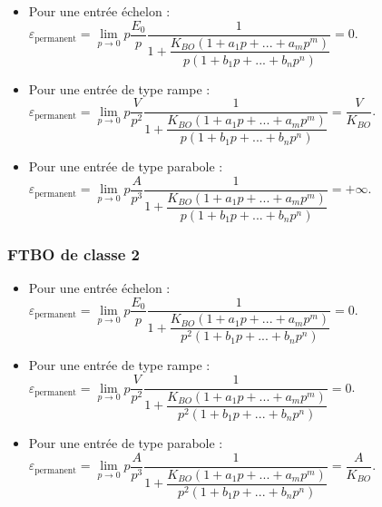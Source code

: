 \documentclass[10pt,fleqn]{article} %
\begin{document}
\begin{itemize}
\item Pour une entrée échelon : 
$\varepsilon_{\text{permanent}}=\lim\limits_{p\to 0} p\dfrac{E_0}{p}\dfrac{1}{1+\dfrac{K_{BO}\left(1+a_1p+...+a_mp^m \right)}{p\left(1+b_1p+...+b_np^n\right)}} 
= 0$.
\item Pour une entrée de type rampe : 
$\varepsilon_{\text{permanent}}=\lim\limits_{p\to 0} p\dfrac{V}{p^2}\dfrac{1}{1+\dfrac{K_{BO}\left(1+a_1p+...+a_mp^m \right)}{p\left(1+b_1p+...+b_np^n\right)}} 
=\dfrac{V}{K_{BO}}$.
\item Pour une entrée de type parabole : 
$\varepsilon_{\text{permanent}}=\lim\limits_{p\to 0} p\dfrac{A}{p^3}\dfrac{1}{1+\dfrac{K_{BO}\left(1+a_1p+...+a_mp^m \right)}{p\left(1+b_1p+...+b_np^n\right)}} 
=+\infty$.
\end{itemize}

\subsubsection*{FTBO de classe 2}

\begin{itemize}
\item Pour une entrée échelon : 
$\varepsilon_{\text{permanent}}=\lim\limits_{p\to 0} p\dfrac{E_0}{p}\dfrac{1}{1+\dfrac{K_{BO}\left(1+a_1p+...+a_mp^m \right)}{p^{2}\left(1+b_1p+...+b_np^n\right)}} 
= 0$.
\item Pour une entrée de type rampe : 
$\varepsilon_{\text{permanent}}=\lim\limits_{p\to 0} p\dfrac{V}{p^2}\dfrac{1}{1+\dfrac{K_{BO}\left(1+a_1p+...+a_mp^m \right)}{p^{2}\left(1+b_1p+...+b_np^n\right)}} 
=0$.
\item Pour une entrée de type parabole : 
$\varepsilon_{\text{permanent}}=\lim\limits_{p\to 0} p\dfrac{A}{p^3}\dfrac{1}{1+\dfrac{K_{BO}\left(1+a_1p+...+a_mp^m \right)}{p^{2}\left(1+b_1p+...+b_np^n\right)}} 
=\dfrac{A}{K_{BO}}$.
\end{itemize}
\end{document}

